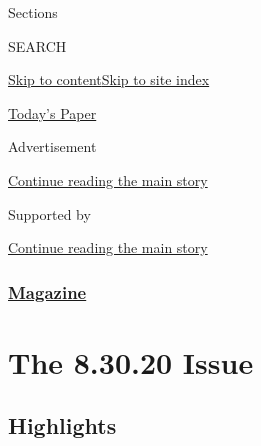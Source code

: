 Sections

SEARCH

\protect\hyperlink{site-content}{Skip to
content}\protect\hyperlink{site-index}{Skip to site index}

\href{https://myaccount.nytimes3xbfgragh.onion/auth/login?response_type=cookie\&client_id=vi}{}

\href{https://www.nytimes3xbfgragh.onion/section/todayspaper}{Today's
Paper}

Advertisement

\protect\hyperlink{after-top}{Continue reading the main story}

Supported by

\protect\hyperlink{after-sponsor}{Continue reading the main story}

\hypertarget{magazine}{%
\subsubsection{\texorpdfstring{\href{/section/magazine}{Magazine}}{Magazine}}\label{magazine}}

\hypertarget{the-83020-issue}{%
\section{The 8.30.20 Issue}\label{the-83020-issue}}

\hypertarget{highlights}{%
\subsection{Highlights}\label{highlights}}

